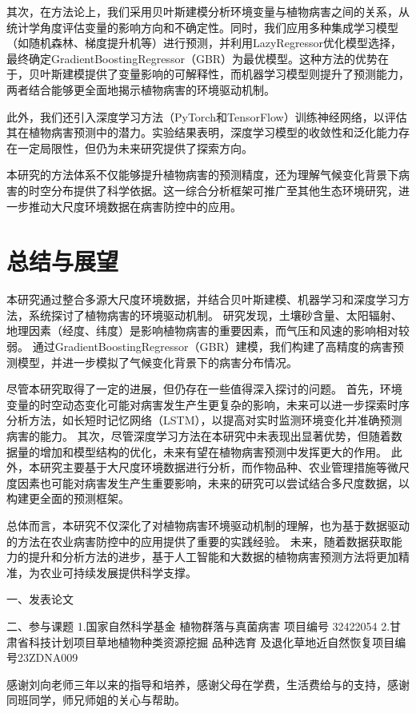 \documentclass[AutoFakeBold]{LZUThesis-PgD&PhD}
\begin{document}
其次，在方法论上，我们采用贝叶斯建模分析环境变量与植物病害之间的关系，从统计学角度评估变量的影响方向和不确定性。同时，我们应用多种集成学习模型（如随机森林、梯度提升机等）进行预测，并利用LazyRegressor优化模型选择，最终确定GradientBoostingRegressor（GBR）为最优模型。这种方法的优势在于，贝叶斯建模提供了变量影响的可解释性，而机器学习模型则提升了预测能力，两者结合能够更全面地揭示植物病害的环境驱动机制。

此外，我们还引入深度学习方法（PyTorch和TensorFlow）训练神经网络，以评估其在植物病害预测中的潜力。实验结果表明，深度学习模型的收敛性和泛化能力存在一定局限性，但仍为未来研究提供了探索方向。

本研究的方法体系不仅能够提升植物病害的预测精度，还为理解气候变化背景下病害的时空分布提供了科学依据。这一综合分析框架可推广至其他生态环境研究，进一步推动大尺度环境数据在病害防控中的应用。

\chapter{总结与展望}

本研究通过整合多源大尺度环境数据，并结合贝叶斯建模、机器学习和深度学习方法，系统探讨了植物病害的环境驱动机制。
研究发现，土壤砂含量、太阳辐射、地理因素（经度、纬度）是影响植物病害的重要因素，而气压和风速的影响相对较弱。
通过GradientBoostingRegressor（GBR）建模，我们构建了高精度的病害预测模型，并进一步模拟了气候变化背景下的病害分布情况。

尽管本研究取得了一定的进展，但仍存在一些值得深入探讨的问题。
首先，环境变量的时空动态变化可能对病害发生产生更复杂的影响，未来可以进一步探索时序分析方法，如长短时记忆网络（LSTM），以提高对实时监测环境变化并准确预测病害的能力\cite{Patle2022}。
其次，尽管深度学习方法在本研究中未表现出显著优势，但随着数据量的增加和模型结构的优化，未来有望在植物病害预测中发挥更大的作用。
此外，本研究主要基于大尺度环境数据进行分析，而作物品种、农业管理措施等微尺度因素也可能对病害发生产生重要影响，未来的研究可以尝试结合多尺度数据，以构建更全面的预测框架。

总体而言，本研究不仅深化了对植物病害环境驱动机制的理解，也为基于数据驱动的方法在农业病害防控中的应用提供了重要的实践经验。
未来，随着数据获取能力的提升和分析方法的进步，基于人工智能和大数据的植物病害预测方法将更加精准，为农业可持续发展提供科学支撑。

	
	\blankpage
	
	
	
	
	\backmatter
	
	
	\printbib
	
	
	
	\Achievements
	一、发表论文
	
	
	\blank
	
	二、参与课题
	1.国家自然科学基金 植物群落与真菌病害 项目编号 32422054
	2.甘肃省科技计划项目草地植物种类资源挖掘 品种选育 及退化草地近自然恢复项目编号23ZDNA009
	
	
	\Thanks
	
	感谢刘向老师三年以来的指导和培养，感谢父母在学费，生活费给与的支持，感谢同班同学，师兄师姐的关心与帮助。
	
	
\end{document}
